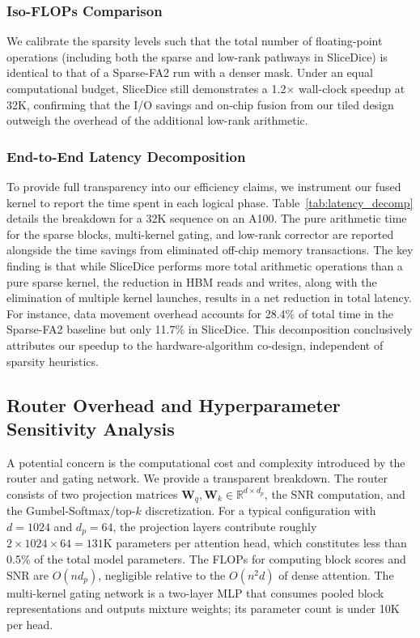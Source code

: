 \documentclass{article}
\begin{document}
\subsubsection{Iso-FLOPs Comparison}
We calibrate the sparsity levels such that the total number of floating-point operations (including both the sparse and low-rank pathways in SliceDice) is identical to that of a Sparse-FA2 run with a denser mask. Under an equal computational budget, SliceDice still demonstrates a 1.2$\times$ wall-clock speedup at 32K, confirming that the I/O savings and on-chip fusion from our tiled design outweigh the overhead of the additional low-rank arithmetic.

\subsubsection{End-to-End Latency Decomposition}
To provide full transparency into our efficiency claims, we instrument our fused kernel to report the time spent in each logical phase. Table~\ref{tab:latency_decomp} details the breakdown for a 32K sequence on an A100. The pure arithmetic time for the sparse blocks, multi-kernel gating, and low-rank corrector are reported alongside the time savings from eliminated off-chip memory transactions. The key finding is that while SliceDice performs more total arithmetic operations than a pure sparse kernel, the reduction in HBM reads and writes, along with the elimination of multiple kernel launches, results in a net reduction in total latency. For instance, data movement overhead accounts for 28.4\% of total time in the Sparse-FA2 baseline but only 11.7\% in SliceDice. This decomposition conclusively attributes our speedup to the hardware-algorithm co-design, independent of sparsity heuristics.

\subsection{Router Overhead and Hyperparameter Sensitivity Analysis}

A potential concern is the computational cost and complexity introduced by the router and gating network. We provide a transparent breakdown. The router consists of two projection matrices $\mathbf{W}_q, \mathbf{W}_k \in \mathbb{R}^{d \times d_p}$, the SNR computation, and the Gumbel-Softmax/top-$k$ discretization. For a typical configuration with $d=1024$ and $d_p=64$, the projection layers contribute roughly $2 \times 1024 \times 64 = 131$K parameters per attention head, which constitutes less than 0.5\% of the total model parameters. The FLOPs for computing block scores and SNR are $O(n d_p)$, negligible relative to the $O(n^2 d)$ of dense attention. The multi-kernel gating network is a two-layer MLP that consumes pooled block representations and outputs mixture weights; its parameter count is under 10K per head.
\end{document}
